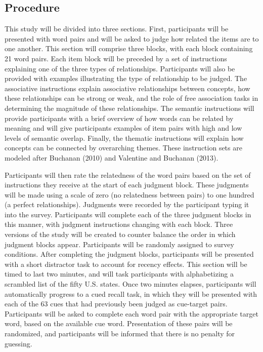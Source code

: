 \documentclass[english,man]{apa6}
\theoremstyle{definition}
\theoremstyle{definition}
\theoremstyle{remark}
\begin{document}
\subsection{Procedure}\label{procedure}

This study will be divided into three sections. First, participants will
be presented with word pairs and will be asked to judge how related the
items are to one another. This section will comprise three blocks, with
each block containing 21 word pairs. Each item block will be preceded by
a set of instructions explaining one of the three types of
relationships. Participants will also be provided with examples
illustrating the type of relationship to be judged. The associative
instructions explain associative relationships between concepts, how
these relationships can be strong or weak, and the role of free
association tasks in determining the magnitude of these relationships.
The semantic instructions will provide participants with a brief
overview of how words can be related by meaning and will give
participants examples of item pairs with high and low levels of semantic
overlap. Finally, the thematic instructions will explain how concepts
can be connected by overarching themes. These instruction sets are
modeled after Buchanan (2010) and Valentine and Buchanan (2013).

Participants will then rate the relatedness of the word pairs based on
the set of instructions they receive at the start of each judgment
block. These judgments will be made using a scale of zero (no
relatedness between pairs) to one hundred (a perfect relationships).
Judgments were recorded by the participant typing it into the survey.
Participants will complete each of the three judgment blocks in this
manner, with judgment instructions changing with each block. Three
versions of the study will be created to counter balance the order in
which judgment blocks appear. Participants will be randomly assigned to
survey conditions. After completing the judgment blocks, participants
will be presented with a short distractor task to account for recency
effects. This section will be timed to last two minutes, and will task
participants with alphabetizing a scrambled list of the fifty U.S.
states. Once two minutes elapses, participants will automatically
progress to a cued recall task, in which they will be presented with
each of the 63 cues that had previously been judged as cue-target pairs.
Participants will be asked to complete each word pair with the
appropriate target word, based on the available cue word. Presentation
of these pairs will be randomized, and participants will be informed
that there is no penalty for guessing.
\end{document}
